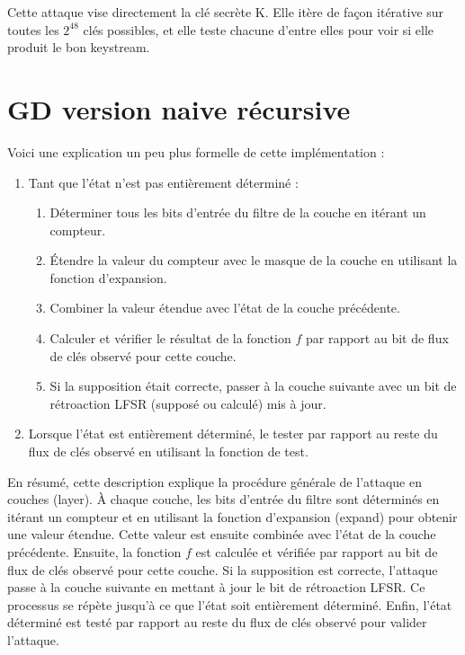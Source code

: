 \documentclass{template}
\begin{document}
Cette attaque vise directement la clé secrète K. Elle itère de façon itérative sur toutes les $2^{48}$ clés possibles, et elle teste chacune d'entre elles pour voir si elle produit le bon keystream.
\section{GD version naive récursive}
\baselineskip=16pt


Voici une explication un peu plus formelle de cette implémentation :

\begin{enumerate}
  \item Tant que l'état n'est pas entièrement déterminé :
    \begin{enumerate}
      \item Déterminer tous les bits d'entrée du filtre de la couche en itérant un compteur.
      \item Étendre la valeur du compteur avec le masque de la couche en utilisant la fonction d'expansion.
      \item Combiner la valeur étendue avec l'état de la couche précédente.
      \item Calculer et vérifier le résultat de la fonction $f$ par rapport au bit de flux de clés observé pour cette couche.
      \item Si la supposition était correcte, passer à la couche suivante avec un bit de rétroaction LFSR (supposé ou calculé) mis à jour.
    \end{enumerate}
  \item Lorsque l'état est entièrement déterminé, le tester par rapport au reste du flux de clés observé en utilisant la fonction de test.
\end{enumerate}

En résumé, cette description explique la procédure générale de l'attaque en couches (layer). À chaque couche, les bits d'entrée du filtre sont déterminés en itérant un compteur et en utilisant la fonction d'expansion (expand) pour obtenir une valeur étendue. Cette valeur est ensuite combinée avec l'état de la couche précédente. Ensuite, la fonction $f$ est calculée et vérifiée par rapport au bit de flux de clés observé pour cette couche. Si la supposition est correcte, l'attaque passe à la couche suivante en mettant à jour le bit de rétroaction LFSR. Ce processus se répète jusqu'à ce que l'état soit entièrement déterminé. Enfin, l'état déterminé est testé par rapport au reste du flux de clés observé pour valider l'attaque.
\end{document}
